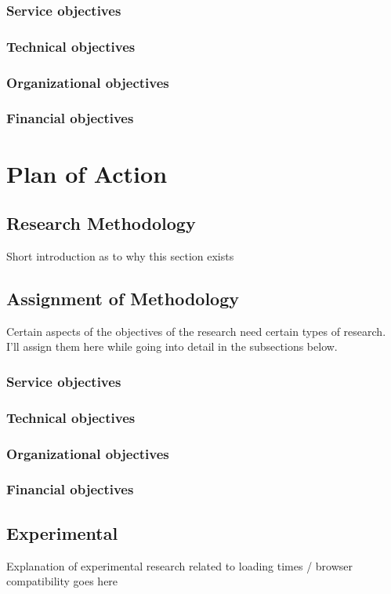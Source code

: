 \documentclass[15pt]{article}
\begin{document}
  	\subsubsection{Service objectives}
    \subsubsection{Technical objectives}
    \subsubsection{Organizational objectives}
    \subsubsection{Financial objectives}

\section{Plan of Action}
  	\subsection{Research Methodology}
  	Short introduction as to why this section exists
  	\subsection{Assignment of Methodology}
    Certain aspects of the objectives of the research need certain types of research. I'll assign them here while going into detail in the subsections below.
	    \subsubsection{Service objectives}
	    \subsubsection{Technical objectives}
	    \subsubsection{Organizational objectives}
	    \subsubsection{Financial objectives}
    \subsection{Experimental}
    Explanation of experimental research related to loading times / browser compatibility goes here
\end{document}
